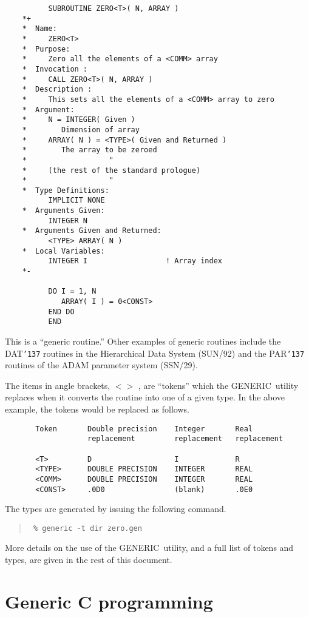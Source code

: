 \documentclass[twoside,11pt]{article}
\renewcommand{\_}{{\tt\char'137}}     %
\newcommand{\xref}[3]{#1}
\newcommand{\GENERIC}{{\footnotesize GENERIC}\normalsize}
\begin{document}
\begin{verbatim}
          SUBROUTINE ZERO<T>( N, ARRAY )
    *+
    *  Name:
    *     ZERO<T>
    *  Purpose:
    *     Zero all the elements of a <COMM> array
    *  Invocation :
    *     CALL ZERO<T>( N, ARRAY )
    *  Description :
    *     This sets all the elements of a <COMM> array to zero
    *  Argument:
    *     N = INTEGER( Given )
    *        Dimension of array
    *     ARRAY( N ) = <TYPE>( Given and Returned )
    *        The array to be zeroed
    *                   "
    *     (the rest of the standard prologue)
    *                   "
    *  Type Definitions:
          IMPLICIT NONE
    *  Arguments Given:
          INTEGER N
    *  Arguments Given and Returned:
          <TYPE> ARRAY( N )
    *  Local Variables:
          INTEGER I                  ! Array index
    *-

          DO I = 1, N
             ARRAY( I ) = 0<CONST>
          END DO
          END
\end{verbatim}

This is a ``generic routine.''
Other examples of generic routines include the DAT\_ routines in
the \xref{Hierarchical Data System}{sun92}{} (SUN/92) and the
\xref{PAR\_ routines}{sun114}{} of the \xref{ADAM parameter
system}{ssn29}{} (SSN/29).

The items in angle brackets, $<>$ , are ``tokens'' which the
\GENERIC\ utility replaces when it converts the routine into one
of a given type.
In the above example, the tokens would be replaced
as follows.

\begin{verbatim}
       Token       Double precision    Integer       Real
                   replacement         replacement   replacement

       <T>         D                   I             R
       <TYPE>      DOUBLE PRECISION    INTEGER       REAL
       <COMM>      DOUBLE PRECISION    INTEGER       REAL
       <CONST>     .0D0                (blank)       .0E0
\end{verbatim}

The types are generated by issuing the following command.

\begin{quote}{\tt
\% generic -t dir zero.gen
}
\end{quote}

More details on the use of the \GENERIC\ utility, and a full list of
tokens and types, are given in the rest of this document.

\section{Generic C programming}
\end{document}
